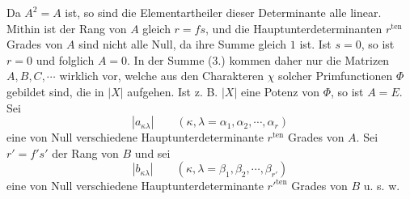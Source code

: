 \documentclass[11pt]{article}
\newcommand{\ten}{\mathrm{ten}}
\begin{document}
Da $A^2=A$ ist, so sind die Elementartheiler dieser Determinante alle linear. Mithin ist der Rang von $A$ gleich $r=fs$, und die Hauptunterdeterminanten $r^{\ten}$ Grades von $A$ sind nicht alle Null, da ihre Summe gleich $1$ ist. Ist $s=0$, so ist $r=0$ und folglich $A=0$. In der Summe (3.) kommen daher nur die Matrizen $A,B,C,\cdots$ wirklich vor, welche aus den Charakteren $\chi$ solcher Primfunctionen $\Phi$ gebildet sind, die in $|X|$ aufgehen. Ist z. B. $|X|$ eine Potenz von $\Phi$, so ist $A=E$. Sei
\begin{equation}\tag{8.}
|a_{\kappa\lambda}|\qquad(\kappa,\lambda=\alpha_1,\alpha_2,\cdots,\alpha_r)
\end{equation}
eine von Null verschiedene Hauptunterdeterminante $r^{\ten}$ Grades von $A$. Sei $r'=f's'$ der Rang von $B$ und sei
\[
|b_{\kappa\lambda}|\qquad(\kappa,\lambda=\beta_1,\beta_2,\cdots,\beta_{r'})
\]
eine von Null verschiedene Hauptunterdeterminante $r'^{\ten}$ Grades von $B$ u. s. w.
\end{document}
